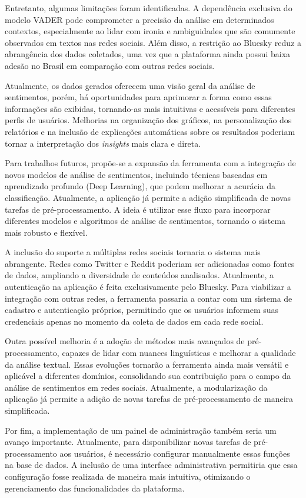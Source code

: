 \documentclass[
	12pt,				%
	oneside,			%
	a4paper,			%
	english,			%
	french,				%
	spanish,			%
	brazil				%
	]{abntex2}
\begin{document}
Entretanto, algumas limitações foram identificadas. A dependência
exclusiva do modelo VADER pode comprometer a precisão da análise em
determinados contextos, especialmente ao lidar com ironia e ambiguidades
que são comumente observados em textos nas redes sociais. Além disso, a
restrição ao Bluesky reduz a abrangência dos dados coletados, uma vez
que a plataforma ainda possui baixa adesão no Brasil em comparação com
outras redes sociais.

Atualmente, os dados gerados oferecem uma visão geral da análise de
sentimentos, porém, há oportunidades para aprimorar a forma como essas
informações são exibidas, tornando-as mais intuitivas e acessíveis para
diferentes perfis de usuários. Melhorias na organização dos gráficos, na
personalização dos relatórios e na inclusão de explicações automáticas
sobre os resultados poderiam tornar a interpretação dos \emph{insights}
mais clara e direta.

Para trabalhos futuros, propõe-se a expansão da ferramenta com a
integração de novos modelos de análise de sentimentos, incluindo
técnicas baseadas em aprendizado profundo (Deep Learning), que podem
melhorar a acurácia da classificação. Atualmente, a aplicação já permite
a adição simplificada de novas tarefas de pré-processamento. A ideia é
utilizar esse fluxo para incorporar diferentes modelos e algoritmos de
análise de sentimentos, tornando o sistema mais robusto e flexível.

A inclusão do suporte a múltiplas redes sociais tornaria o sistema mais
abrangente. Redes como Twitter e Reddit poderiam ser adicionadas como
fontes de dados, ampliando a diversidade de conteúdos analisados.
Atualmente, a autenticação na aplicação é feita exclusivamente pelo
Bluesky. Para viabilizar a integração com outras redes, a ferramenta
passaria a contar com um sistema de cadastro e autenticação próprios,
permitindo que os usuários informem suas credenciais apenas no momento
da coleta de dados em cada rede social.

Outra possível melhoria é a adoção de métodos mais avançados de
pré-processamento, capazes de lidar com nuances linguísticas e melhorar
a qualidade da análise textual. Essas evoluções tornarão a ferramenta
ainda mais versátil e aplicável a diferentes domínios, consolidando sua
contribuição para o campo da análise de sentimentos em redes sociais.
Atualmente, a modularização da aplicação já permite a adição de novas
tarefas de pré-processamento de maneira simplificada.

Por fim, a implementação de um painel de administração também seria um
avanço importante. Atualmente, para disponibilizar novas tarefas de
pré-processamento aos usuários, é necessário configurar manualmente
essas funções na base de dados. A inclusão de uma interface
administrativa permitiria que essa configuração fosse realizada de
maneira mais intuitiva, otimizando o gerenciamento das funcionalidades
da plataforma.
\end{document}
